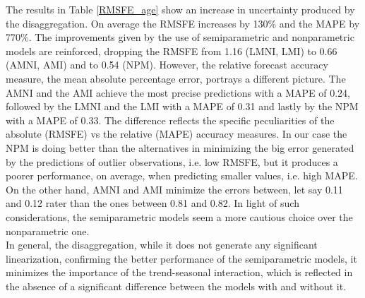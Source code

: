 \documentclass{article}\usepackage[]{graphicx}\usepackage[]{color}
\begin{document}
The results in Table \ref{RMSFE_age}  show an increase in uncertainty produced by the disaggregation. On average the RMSFE increases by 130\% and the MAPE by 770\%.  The improvements given by the use of semiparametric and nonparametric models are reinforced, dropping the RMSFE from 1.16 (LMNI, LMI) to 0.66 (AMNI, AMI) and to 0.54 (NPM). However, the relative forecast accuracy measure, the mean absolute percentage error, portrays a different picture. The AMNI and the AMI achieve the most precise predictions with a MAPE of 0.24, followed by the LMNI and the LMI with a MAPE of 0.31 and lastly by the NPM with a MAPE of 0.33. The difference reflects the specific peculiarities of the absolute (RMSFE) vs the relative (MAPE) accuracy measures. In our case the NPM is doing better than the alternatives in minimizing the big error generated by the predictions of outlier observations, i.e. low RMSFE, but it produces a poorer performance, on average, when predicting smaller values, i.e. high MAPE. On the other hand, AMNI and AMI minimize the errors between, let say 0.11 and 0.12 rater than the ones between 0.81 and 0.82. In light of such considerations, the semiparametric models seem a more cautious choice over the nonparametric one. \\
In general, the disaggregation, while it does not generate any significant linearization, confirming the better performance of the semiparametric models, it minimizes the importance of the trend-seasonal interaction, which is reflected in the absence of a significant difference between the models with and without it. 

\begin{table}
\centering
\caption{2nd order Fourier models on Swiss Immigration Disaggregated Data: Root Mean Square Forecast Error (RMSFE) and Mean Average Percentage Error (MAPE) and prediction interval coverage}
\label{RMSFE_age} 
\end{table}
\end{document}
